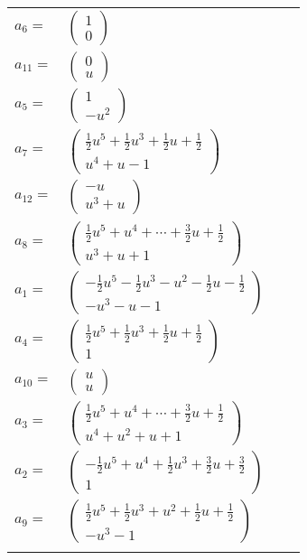 \documentclass[1p]{elsarticle_modified}
\theoremstyle{definition}
\begin{document}
\begin{tabular}{m{7pt} m{180pt} m{7pt} m{180pt} }
\flushright $a_{6}=$&$\begin{pmatrix}1\\0\end{pmatrix}$ \\
\flushright $a_{11}=$&$\begin{pmatrix}0\\u\end{pmatrix}$ \\
\flushright $a_{5}=$&$\begin{pmatrix}1\\- u^2\end{pmatrix}$ \\
\flushright $a_{7}=$&$\begin{pmatrix}\frac{1}{2} u^5+\frac{1}{2} u^3+\frac{1}{2} u+\frac{1}{2}\\u^4+u-1\end{pmatrix}$ \\
\flushright $a_{12}=$&$\begin{pmatrix}- u\\u^3+u\end{pmatrix}$ \\
\flushright $a_{8}=$&$\begin{pmatrix}\frac{1}{2} u^5+u^4+\cdots+\frac{3}{2} u+\frac{1}{2}\\u^3+u+1\end{pmatrix}$ \\
\flushright $a_{1}=$&$\begin{pmatrix}-\frac{1}{2} u^5-\frac{1}{2} u^3- u^2-\frac{1}{2} u-\frac{1}{2}\\- u^3- u-1\end{pmatrix}$ \\
\flushright $a_{4}=$&$\begin{pmatrix}\frac{1}{2} u^5+\frac{1}{2} u^3+\frac{1}{2} u+\frac{1}{2}\\1\end{pmatrix}$ \\
\flushright $a_{10}=$&$\begin{pmatrix}u\\u\end{pmatrix}$ \\
\flushright $a_{3}=$&$\begin{pmatrix}\frac{1}{2} u^5+u^4+\cdots+\frac{3}{2} u+\frac{1}{2}\\u^4+u^2+u+1\end{pmatrix}$ \\
\flushright $a_{2}=$&$\begin{pmatrix}-\frac{1}{2} u^5+u^4+\frac{1}{2} u^3+\frac{3}{2} u+\frac{3}{2}\\1\end{pmatrix}$ \\
\flushright $a_{9}=$&$\begin{pmatrix}\frac{1}{2} u^5+\frac{1}{2} u^3+u^2+\frac{1}{2} u+\frac{1}{2}\\- u^3-1\end{pmatrix}$\\&\end{tabular}
\end{document}
